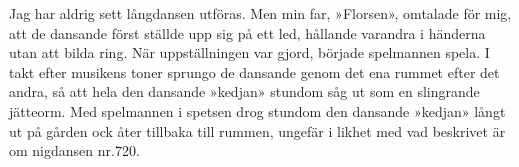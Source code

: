 \vspace*{7cm}
\begin{center}
\parbox{12cm}{
Jag har aldrig sett långdansen utföras. Men min far, »Florsen», omtalade
för mig, att de dansande först ställde upp sig på ett led, hållande
varandra i händerna utan att bilda ring. \textemdash{} När uppställningen
var gjord, började spelmannen spela. I takt efter musikens toner sprungo
de dansande genom det ena rummet efter det andra, så att hela den
dansande »kedjan» stundom såg ut som en slingrande jätteorm. Med spelmannen
i spetsen drog stundom den dansande »kedjan» långt ut på gården ock
åter tillbaka till rummen, ungefär i likhet med vad beskrivet är om
nigdansen nr.\@ 720.
}
\end{center}

